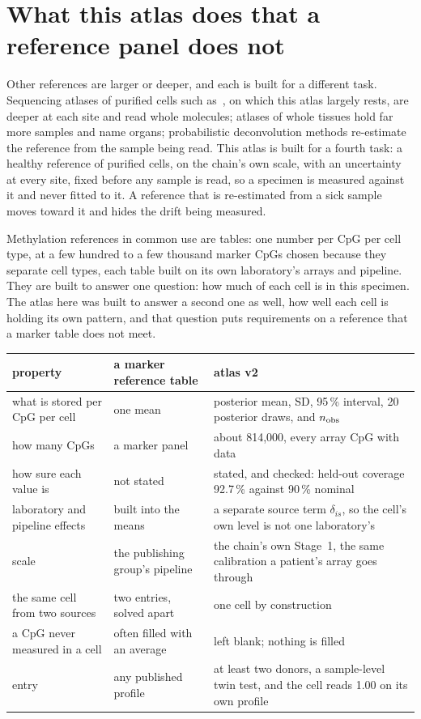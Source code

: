 \section{What this atlas does that a reference panel does not}

Other references are larger or deeper, and each is built for a different task. Sequencing atlases of purified cells such as~\cite{Loyfer2023},
on which this atlas largely rests, are deeper at each site and read whole molecules; atlases of whole tissues hold far more samples and name
organs; probabilistic deconvolution methods re-estimate the reference from the sample being read. This atlas is built for a fourth task:
a healthy reference of purified cells, on the chain's own scale, with an uncertainty at every site, fixed before any sample is read, so a
specimen is measured against it and never fitted to it. A reference that is re-estimated from a sick sample moves toward it and hides the
drift being measured.


Methylation references in common use are tables: one number per CpG per cell type, at a few hundred to a few thousand marker CpGs chosen
because they separate cell types, each table built on its own laboratory's arrays and pipeline. They are built to answer one question: how
much of each cell is in this specimen. The atlas here was built to answer a second one as well, how well each cell is holding its own pattern,
and that question puts requirements on a reference that a marker table does not meet.
\begin{center}\small
\begin{tabular}{@{}p{}p{}p{}@{}}\toprule
property & a marker reference table & atlas v2 \\\midrule
what is stored per CpG per cell & one mean & posterior mean, SD, 95\,\% interval, 20 posterior draws, and $n_{\rm obs}$ \\
how many CpGs & a marker panel & about 814,000, every array CpG with data \\
how sure each value is & not stated & stated, and checked: held-out coverage 92.7\,\% against 90\,\% nominal \\
laboratory and pipeline effects & built into the means & a separate source term $\delta_{is}$, so the cell's own level is not one laboratory's \\
scale & the publishing group's pipeline & the chain's own Stage~1, the same calibration a patient's array goes through \\
the same cell from two sources & two entries, solved apart & one cell by construction \\
a CpG never measured in a cell & often filled with an average & left blank; nothing is filled \\
entry & any published profile & at least two donors, a sample-level twin test, and the cell reads 1.00 on its own profile \\\bottomrule
\end{tabular}
\end{center}


